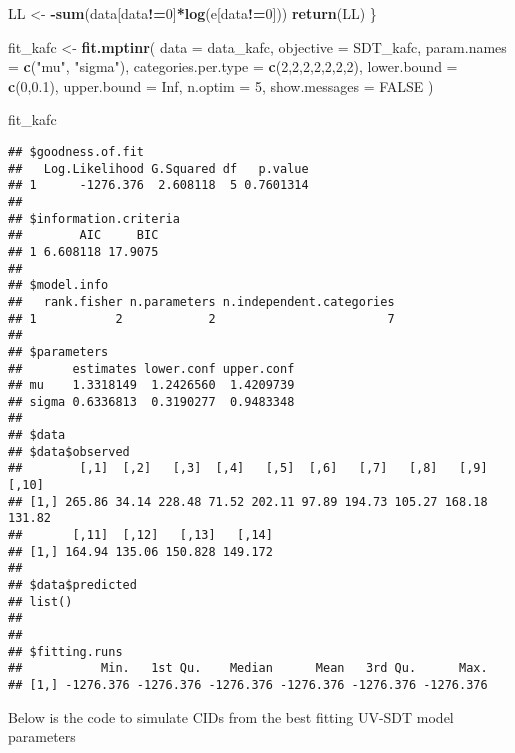 \documentclass[]{article}
\newenvironment{Shaded}{\begin{snugshade}}{\end{snugshade}}
\newcommand{\KeywordTok}[1]{\textcolor[rgb]{0.13,0.29,0.53}{\textbf{#1}}}
\newcommand{\DataTypeTok}[1]{\textcolor[rgb]{0.13,0.29,0.53}{#1}}
\newcommand{\DecValTok}[1]{\textcolor[rgb]{0.00,0.00,0.81}{#1}}
\newcommand{\FloatTok}[1]{\textcolor[rgb]{0.00,0.00,0.81}{#1}}
\newcommand{\StringTok}[1]{\textcolor[rgb]{0.31,0.60,0.02}{#1}}
\newcommand{\OtherTok}[1]{\textcolor[rgb]{0.56,0.35,0.01}{#1}}
\newcommand{\OperatorTok}[1]{\textcolor[rgb]{0.81,0.36,0.00}{\textbf{#1}}}
\newcommand{\NormalTok}[1]{#1}
\begin{document}
\begin{Shaded}
\begin{Highlighting}[]
    
\NormalTok{    LL <-}\StringTok{ }\OperatorTok{-}\KeywordTok{sum}\NormalTok{(data[data}\OperatorTok{!=}\DecValTok{0}\NormalTok{]}\OperatorTok{*}\KeywordTok{log}\NormalTok{(e[data}\OperatorTok{!=}\DecValTok{0}\NormalTok{]))}
    \KeywordTok{return}\NormalTok{(LL)}
\NormalTok{\}}


\NormalTok{fit_kafc <-}\StringTok{ }\KeywordTok{fit.mptinr}\NormalTok{(}
  \DataTypeTok{data =}\NormalTok{ data_kafc, }
  \DataTypeTok{objective =}\NormalTok{ SDT_kafc, }
  \DataTypeTok{param.names =} \KeywordTok{c}\NormalTok{(}\StringTok{"mu"}\NormalTok{, }\StringTok{"sigma"}\NormalTok{), }
  \DataTypeTok{categories.per.type =} \KeywordTok{c}\NormalTok{(}\DecValTok{2}\NormalTok{,}\DecValTok{2}\NormalTok{,}\DecValTok{2}\NormalTok{,}\DecValTok{2}\NormalTok{,}\DecValTok{2}\NormalTok{,}\DecValTok{2}\NormalTok{,}\DecValTok{2}\NormalTok{), }
  \DataTypeTok{lower.bound =} \KeywordTok{c}\NormalTok{(}\DecValTok{0}\NormalTok{,}\FloatTok{0.1}\NormalTok{), }
  \DataTypeTok{upper.bound =} \OtherTok{Inf}\NormalTok{, }
  \DataTypeTok{n.optim =} \DecValTok{5}\NormalTok{,}
  \DataTypeTok{show.messages =} \OtherTok{FALSE}
\NormalTok{  )}

\NormalTok{fit_kafc}
\end{Highlighting}
\end{Shaded}

\begin{verbatim}
## $goodness.of.fit
##   Log.Likelihood G.Squared df   p.value
## 1      -1276.376  2.608118  5 0.7601314
## 
## $information.criteria
##        AIC     BIC
## 1 6.608118 17.9075
## 
## $model.info
##   rank.fisher n.parameters n.independent.categories
## 1           2            2                        7
## 
## $parameters
##       estimates lower.conf upper.conf
## mu    1.3318149  1.2426560  1.4209739
## sigma 0.6336813  0.3190277  0.9483348
## 
## $data
## $data$observed
##        [,1]  [,2]   [,3]  [,4]   [,5]  [,6]   [,7]   [,8]   [,9]  [,10]
## [1,] 265.86 34.14 228.48 71.52 202.11 97.89 194.73 105.27 168.18 131.82
##       [,11]  [,12]   [,13]   [,14]
## [1,] 164.94 135.06 150.828 149.172
## 
## $data$predicted
## list()
## 
## 
## $fitting.runs
##           Min.   1st Qu.    Median      Mean   3rd Qu.      Max.
## [1,] -1276.376 -1276.376 -1276.376 -1276.376 -1276.376 -1276.376
\end{verbatim}

Below is the code to simulate CIDs from the best fitting UV-SDT model
parameters
\end{document}
